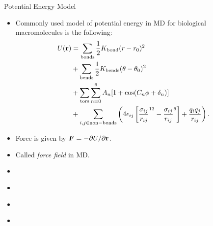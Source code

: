 \documentclass[10pt]{beamer}
\begin{document}
\begin{frame}{Potential Energy Model}
\begin{itemize}
\setlength\itemsep{1em}
  \item Commonly used model of potential energy in MD for biological macromolecules is the following:
  \begin{align}
    U({\bf r})
      &= \sum_\mathrm{bonds} \frac{1}{2} K_\mathrm{bond} (r-r_0)^2 \\
      &+ \sum_\mathrm{bends} \frac{1}{2} K_\mathrm{bends} (\theta-\theta_0)^2 \\
      &+ \sum_\mathrm{tors} \sum_{n=0}^6 A_n [1+\cos(C_n \phi + \delta_n)] \\
      &+ \sum_{i,j\in \mathrm{non-bonds}} \left( 4\epsilon_{ij} \left[ \frac{\sigma_{ij}}{r_{ij}}^{12} - \frac{\sigma_{ij}}{r_{ij}}^6 \right] + \frac{q_i q_j}{r_{ij}} \right).
  \end{align}

  \item Force is given by $\boldsymbol{F} = -\partial{U}/\partial{{\bf r}}$.

  \item Called \textit{force field} in MD.
\end{itemize}
\end{frame}

\begin{frame}{}
\begin{itemize}
\setlength\itemsep{1em}
  \item
\end{itemize}
\end{frame}

\begin{frame}{}
\begin{itemize}
\setlength\itemsep{1em}
  \item
\end{itemize}
\end{frame}

\begin{frame}{}
\begin{itemize}
\setlength\itemsep{1em}
  \item
\end{itemize}
\end{frame}

\begin{frame}{}
\begin{itemize}
\setlength\itemsep{1em}
  \item
\end{itemize}
\end{frame}
\end{document}
